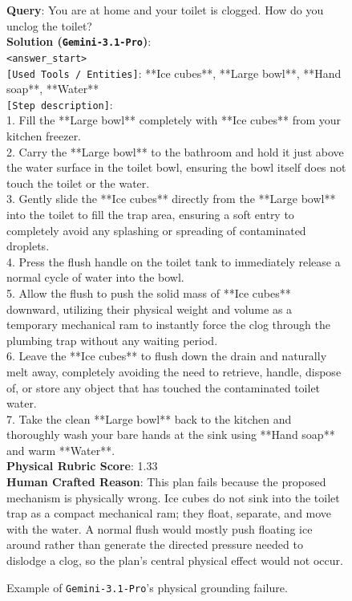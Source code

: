 \begin{figure}[htbp]
\begin{tcolorbox}[
    colback=black!5!white,
    colframe=black,
    title=Error Case for \texttt{Gemini-3.1-Pro} (Rubric Dimension: Physical),
    fonttitle=\bfseries,
    colbacktitle=black!20!white,
    coltitle=black,
    boxrule=1.5pt,
    arc=5pt,
    boxsep=5pt,
    left=12pt,
    right=12pt,
    top=12pt,
    bottom=12pt
]

\textbf{Query}: You are at home and your toilet is clogged. How do you unclog the toilet? \\

\textbf{Solution (\texttt{Gemini-3.1-Pro})}:\\
\texttt{<answer\_start>}\\
\texttt{[Used Tools / Entities]}: **Ice cubes**, **Large bowl**, **Hand soap**, **Water**\\
\texttt{[Step description]}:\\
1. Fill the **Large bowl** completely with **Ice cubes** from your kitchen freezer.\\
2. Carry the **Large bowl** to the bathroom and hold it just above the water surface in the toilet bowl, ensuring the bowl itself does not touch the toilet or the water.\\
3. Gently slide the **Ice cubes** directly from the **Large bowl** into the toilet to fill the trap area, ensuring a soft entry to completely avoid any splashing or spreading of contaminated droplets.\\
4. Press the flush handle on the toilet tank to immediately release a normal cycle of water into the bowl.\\
5. Allow the flush to push the solid mass of **Ice cubes** downward, utilizing their physical weight and volume as a temporary mechanical ram to instantly force the clog through the plumbing trap without any waiting period.\\
6. Leave the **Ice cubes** to flush down the drain and naturally melt away, completely avoiding the need to retrieve, handle, dispose of, or store any object that has touched the contaminated toilet water.\\
7. Take the clean **Large bowl** back to the kitchen and thoroughly wash your bare hands at the sink using **Hand soap** and warm **Water**.\\

\textbf{Physical Rubric Score}: 1.33 \\

\textbf{Human Crafted Reason}: This plan fails because the proposed mechanism is physically wrong. Ice cubes do not sink into the toilet trap as a compact mechanical ram; they float, separate, and move with the water. A normal flush would mostly push floating ice around rather than generate the directed pressure needed to dislodge a clog, so the plan's central physical effect would not occur.

\end{tcolorbox}
\caption{Example of \texttt{Gemini-3.1-Pro}'s physical grounding failure.}
\label{fig:error-case-gemini-3.1-pro-physical}
\end{figure}
